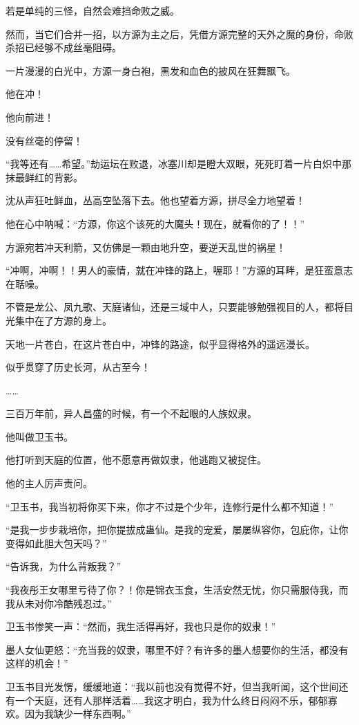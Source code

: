 \begin{this_body}
若是单纯的三怪，自然会难挡命败之威。

然而，当它们合并一招，以方源为主之后，凭借方源完整的天外之魔的身份，命败杀招已经够不成丝毫阻碍。

一片漫漫的白光中，方源一身白袍，黑发和血色的披风在狂舞飘飞。

他在冲！

他向前进！

没有丝毫的停留！

“我等还有……希望。”劫运坛在败退，冰塞川却是瞪大双眼，死死盯着一片白炽中那抹最鲜红的背影。

沈从声狂吐鲜血，丛高空坠落下去。他也望着方源，拼尽全力地望着！

他在心中呐喊：“方源，你这个该死的大魔头！现在，就看你的了！！”

方源宛若冲天利箭，又仿佛是一颗由地升空，要逆天乱世的祸星！

“冲啊，冲啊！！男人的豪情，就在冲锋的路上，喔耶！”方源的耳畔，是狂蛮意志在聒噪。

不管是龙公、凤九歌、天庭诸仙，还是三域中人，只要能够勉强视目的人，都将目光集中在了方源的身上。

天地一片苍白，在这片苍白中，冲锋的路途，似乎显得格外的遥远漫长。

似乎贯穿了历史长河，从古至今！

……

三百万年前，异人昌盛的时候，有一个不起眼的人族奴隶。

他叫做卫玉书。

他打听到天庭的位置，他不愿意再做奴隶，他逃跑又被捉住。

他的主人厉声责问。

“卫玉书，我当初将你买下来，你才不过是个少年，连修行是什么都不知道！”

“是我一步步栽培你，把你提拔成蛊仙。是我的宠爱，屡屡纵容你，包庇你，让你变得如此胆大包天吗？”

“告诉我，为什么背叛我？”

“我夜彤王女哪里亏待了你？！你是锦衣玉食，生活安然无忧，你只需服侍我，而我从未对你冷酷残忍过。”

卫玉书惨笑一声：“然而，我生活得再好，我也只是你的奴隶！”

墨人女仙更怒：“充当我的奴隶，哪里不好？有许多的墨人想要你的生活，都没有这样的机会！”

卫玉书目光发愣，缓缓地道：“我以前也没有觉得不好，但当我听闻，这个世间还有一个天庭，还有人那样活着……我这才明白，我为什么终日闷闷不乐，郁郁寡欢。因为我缺少一样东西啊。”


\end{this_body}
